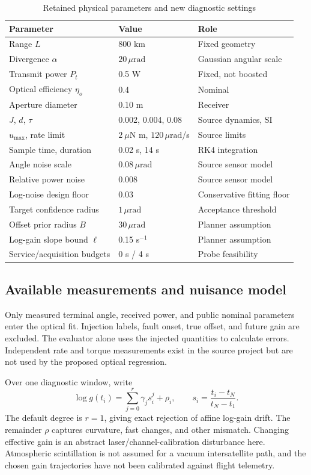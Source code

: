 \documentclass[journal]{IEEEtran}
\newcommand{\um}{\,\mu\mathrm{rad}}
\begin{document}
\begin{table}[t]
\caption{Retained physical parameters and new diagnostic settings}
\centering\footnotesize
\begin{tabular}{@{}p{}p{}p{}@{}}\toprule
Parameter & Value & Role\\\midrule
Range $L$ & 800 km & Fixed geometry\\
Divergence $\alpha$ & $20\um$ & Gaussian angular scale\\
Transmit power $P_t$ & 0.5 W & Fixed, not boosted\\
Optical efficiency $\eta_o$ & 0.4 & Nominal\\
Aperture diameter & 0.10 m & Receiver\\
$J$, $d$, $\tau$ & 0.002, 0.004, 0.08 & Source dynamics, SI\\
$u_{\max}$, rate limit & $2~\mu$N m, $120\um$/s & Source limits\\
Sample time, duration & 0.02 s, 14 s & RK4 integration\\
Angle noise scale & $0.08\um$ & Source sensor model\\
Relative power noise & 0.008 & Source sensor model\\
Log-noise design floor & 0.03 & Conservative fitting floor\\
Target confidence radius & $1\um$ & Acceptance threshold\\
Offset prior radius $B$ & $30\um$ & Planner assumption\\
Log-gain slope bound $\ell$ & 0.15 s$^{-1}$ & Planner assumption\\
Service/acquisition budgets & 0 s / 4 s & Probe feasibility\\\bottomrule
\end{tabular}
\label{tab:params}
\end{table}

\subsection{Available measurements and nuisance model}
Only measured terminal angle, received power, and public nominal parameters enter the optical fit. Injection labels, fault onset, true offset, and future gain are excluded. The evaluator alone uses the injected quantities to calculate errors. Independent rate and torque measurements exist in the source project but are not used by the proposed optical regression.

Over one diagnostic window, write
\begin{equation}
 \log g(t_i)=\sum_{j=0}^{r}\gamma_j s_i^j+\rho_i,
 \qquad s_i=\frac{t_i-t_N}{t_N-t_1}.
\end{equation}
The default degree is $r=1$, giving exact rejection of affine log-gain drift. The remainder $\rho$ captures curvature, fast changes, and other mismatch. Changing effective gain is an abstract laser/channel-calibration disturbance here. Atmospheric scintillation is not assumed for a vacuum intersatellite path, and the chosen gain trajectories have not been calibrated against flight telemetry.
\end{document}
